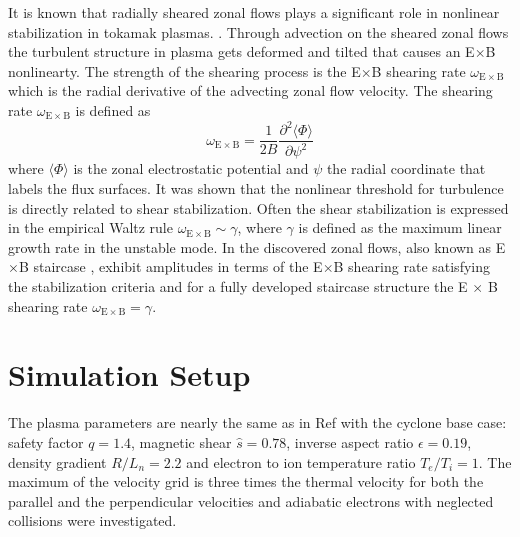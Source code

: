 \documentclass[aip, amsmath, amssymb, reprint, twocolumn]{revtex4-1}
\begin{document}


It is known that radially sheared zonal flows plays a significant role in nonlinear stabilization in tokamak plasmas. \cite{WACooper1988,doi:10.1063/1.859529,doi:10.1063/1.873896}. 
Through advection on the sheared zonal flows the turbulent structure in plasma gets deformed and tilted that causes an E$\times$B nonlinearty. \cite{doi:10.1063/1.859529, doi:10.1063/1.871313, doi:10.1063/1.872367}
The strength of the shearing process is the E$\times$B shearing rate $\omega_{\mathrm{E \times B}}$ which is the radial derivative of the advecting zonal flow velocity. \cite{doi:10.1063/1.871313, doi:10.1063/1.872847}
The shearing rate $\omega_{\mathrm{E \times B}}$ is defined as 
\begin{equation}
	\omega_{\mathrm{E \times B}} = \frac{1}{2B} \frac{\partial^2 \langle \Phi \rangle}{\partial \psi^2}
	\label{eq:shearingrate}
\end{equation}
where $\langle \Phi \rangle$ is the zonal electrostatic potential and $\psi$ the radial coordinate that labels the flux surfaces. \cite{doi:10.1063/1.4952621, doi:10.1063/1.3005380}
It was shown that the nonlinear threshold for turbulence is directly related to shear stabilization. \cite{doi:10.1063/1.873896} 
Often the shear stabilization is expressed in the empirical Waltz rule $\omega_{\mathrm{E \times B}} \sim \gamma$, \cite{doi:10.1063/1.870934, doi:10.1063/1.872847} where $\gamma$ is defined as the maximum linear growth rate in the unstable mode. In the discovered zonal flows, also known as E$\times$B staircase \cite{PhysRevE.82.025401}, exhibit amplitudes in terms of the E$\times$B shearing rate satisfying the stabilization criteria and for a fully developed staircase structure the E $\times$ B shearing rate $\omega_{\mathrm{E \times B}} = \gamma$. \cite{doi:10.1063/1.4961231, doi:10.1063/1.4952621}

\section{Simulation Setup}
\label{sec:setup}

The plasma parameters are nearly the same as in Ref  with the cyclone base case: safety factor $q = 1.4$, magnetic shear $\hat{s} = 0.78$, inverse aspect ratio $\epsilon = 0.19$, density gradient $R/L_n = 2.2$ and electron to ion temperature ratio $T_e/T_i = 1$. The maximum of the velocity grid is three times the thermal velocity for both the parallel and the perpendicular velocities and adiabatic electrons with neglected collisions were investigated.
\end{document}
